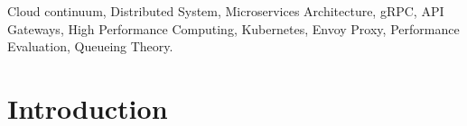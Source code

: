 \documentclass{ieeeaccess}
\begin{document}
	
	
\begin{keywords}
	Cloud continuum, Distributed System, Microservices Architecture, gRPC, API Gateways, High Performance Computing, Kubernetes, Envoy Proxy, Performance Evaluation, Queueing Theory. 
\end{keywords}
	
	\titlepgskip=-21pt
	
\maketitle
	
	
\section{Introduction}
\label{sec:intro}
	
\end{document}
